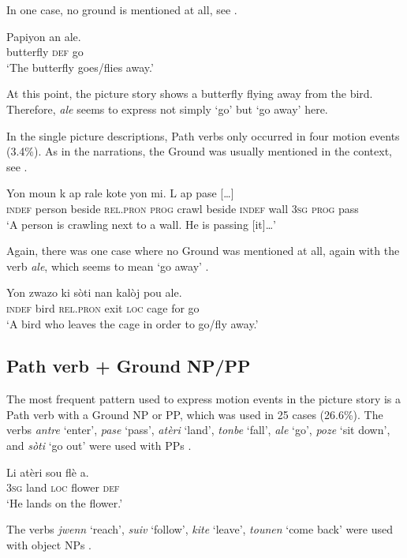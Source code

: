 \documentclass[output=paper,colorlinks,citecolor=brown]{langscibook}
\begin{document}
In one case, no ground is mentioned at all, see .

\ea\label{ex:3:34}
\gll Papiyon an ale.\\
     butterfly \textsc{def} go\\
\glt ‘The butterfly goes/flies away.’
\z

At this point, the picture story shows a butterfly flying away from the bird. Therefore, \textit{ale} seems to express not simply `go' but `go away' here.

In the single picture descriptions, Path verbs only occurred in four motion events (3.4\%). As in the narrations, the Ground was usually mentioned in the context, see .

\ea\label{ex:3:35}
\gll    Yon moun k ap rale kote yon mi.  L ap pase {[}…{]} \\
        \textsc{indef} person beside \textsc{rel.pron} \textsc{prog} crawl beside \textsc{indef} wall  \textsc{3sg} \textsc{prog} pass \\
\glt ‘A person is crawling next to a wall. He is passing {[}it{]}…’
\z

Again, there was one case where no Ground was mentioned at all, again with the verb \textit{ale}, which seems to mean `go away' .

\ea\label{ex:3:36}
\gll Yon zwazo ki sòti nan kalòj pou ale.\\
     \textsc{indef} bird \textsc{rel.pron} exit \textsc{loc} cage for go \\
\glt ‘A bird who leaves the cage in order to go/fly away.’
\z

\subsection{Path verb + Ground NP/PP}

The most frequent pattern used to express motion events in the picture story is a Path verb with a Ground NP or PP, which was used in 25 cases (26.6\%). The verbs \emph{antre} ‘enter’, \emph{pase} ‘pass’, \emph{atèri} ‘land’, \emph{tonbe} ‘fall’, \emph{ale} ‘go’, \emph{poze} ‘sit down’, and \emph{sòti} ‘go out’ were used with PPs .

\ea
\label{ex:3:37}
\gll Li atèri sou flè a.\\
     \textsc{3sg} land \textsc{loc} flower \textsc{def}\\
\glt ‘He lands on the flower.’
\z

The verbs \emph{jwenn} ‘reach’, \emph{suiv} ‘follow’, \emph{kite} ‘leave’, \emph{tounen} ‘come back’ were used with object NPs .
\end{document}
